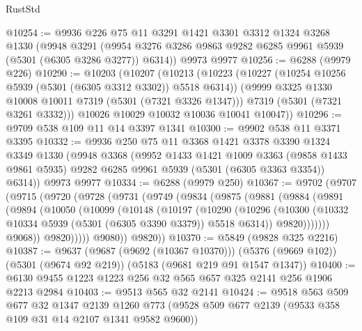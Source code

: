 \begin{lexlean}{RustStd}
\begin{coremodule}
@10254 := @9936
    @226
    @75
    @11
    @3291
    @1421
    @3301
    @3312
    @1324
    @3268
    @1330
    (@9948
      @3291
      (@9954 @3276 @3286 @9863 @9282 @6285 @9961 @5939 (@5301 (@6305 @3286 @3277)) @6314))
    @9973
    @9977
@10256 := @6288 (@9979 @226)
@10290 := @10203
    (@10207
      (@10213
        (@10223
          (@10227 (@10254 @10256 @5939 (@5301 (@6305 @3312 @3302)) @5518 @6314))
          (@9999 @3325 @1330 @10008 @10011 @7319 (@5301 (@7321 @3326 @1347)))
          @7319
          (@5301 (@7321 @3261 @3332)))
        @10026
        @10029
        @10032
        @10036
        @10041
        @10047))
@10296 := @9709 @538 @109 @11 @14 @3397 @1341
@10300 := @9902 @538 @11 @3371 @3395
@10332 := @9936
    @250
    @75
    @11
    @3368
    @1421
    @3378
    @3390
    @1324
    @3349
    @1330
    (@9948
      @3368
      (@9952
        @1433
        @1421
        @1009
        @3363
        (@9858 @1433 @9861 @5935)
        @9282
        @6285
        @9961
        @5939
        (@5301 (@6305 @3363 @3354))
        @6314))
    @9973
    @9977
@10334 := @6288 (@9979 @250)
@10367 := @9702
    (@9707
      (@9715
        (@9720
          (@9728
            (@9731
              (@9749
                (@9834
                  (@9875
                    (@9881
                      (@9884
                        (@9891
                          (@9894
                            (@10050
                              (@10099
                                (@10148
                                  (@10197
                                    (@10290
                                      (@10296
                                        (@10300
                                          (@10332
                                            @10334
                                            @5939
                                            (@5301 (@6305 @3390 @3379))
                                            @5518
                                            @6314))
                                        @9820)))))))
                          @9068))
                      @9820)))))
            @9080))
        @9820))
@10370 := @5849 (@9828 @325 @2216)
@10387 := @9637
    (@9687 (@9692 (@10367 @10370)))
    (@5376 (@9669 @102))
    (@5301 (@9674 @92 @219))
    (@5183 (@9681 @219 @91 @1547 @1347))
@10400 := @6130 @9455 @1223 @1223 @256 @32 @565 @657 @325 @2141 @256 @1906 @2213 @2984
@10403 := @9513 @565 @32 @2141
@10424 := @9518
    @563
    @509
    @677
    @32
    @1347
    @2139
    @1260
    @773
    (@9528 @509 @677 @2139 (@9533 @358 @109 @31 @14 @2107 @1341 @9582 @9600))

\end{coremodule}
\end{lexlean}
